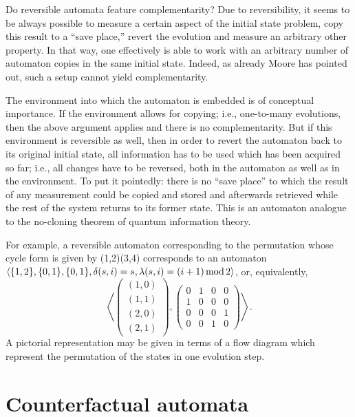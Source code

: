 Do reversible automata feature complementarity?
Due to reversibility, it seems to be always possible to measure
a certain aspect of the initial state problem,
copy this result to a ``save place,''
revert the evolution and measure an arbitrary other property.
In that way, one effectively is able to work with an arbitrary number of automaton copies
in the same initial state.
Indeed, as already Moore has pointed out, such a setup cannot yield complementarity.

The environment into which the  automaton is embedded is of conceptual importance.
If the environment allows for copying;
i.e., one-to-many evolutions, then the above argument applies and there is no complementarity.
But if this environment is reversible as well,
then in order to revert the automaton back to its original initial state,
all information has to be used which has been acquired so far; i.e., all changes
have to be reversed, both in the automaton as well as in the environment.
To put it pointedly: there is no  ``save place'' to which the result
of any measurement could be copied and stored and afterwards retrieved
while the rest of the system returns to its former state.
This is an automaton analogue to the no-cloning theorem of quantum information theory.

For example, a reversible automaton corresponding to the permutation whose cycle form
is given by (1,2)(3,4) corresponds to an automaton
$\langle \{1,2\},\{0,1\},\{0,1\},\delta (s,i)=s ,\lambda (s,i)= (i+1)\,{\rm mod} \,2 \rangle$,
or, equivalently,
\begin{equation}
\left\langle
\left(
\begin{array}{llllll}
(1,0)\\(1,1)\\(2,0)\\(2,1)
\end{array}
\right) ,
\left(
{
\begin{array}{llllll}
0&1&0&0\\
1&0&0&0\\
0&0&0&1\\
0&0&1&0
\end{array}
}
\right)
  \right\rangle .
\end{equation}
A pictorial representation may be given in terms of a flow diagram
which represent the permutation of the states in one evolution step.



\section{Counterfactual automata}

